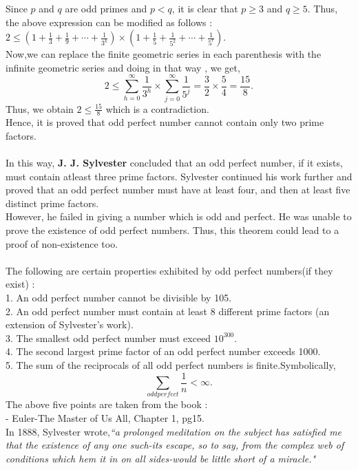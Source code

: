 \documentclass[a4paper,reqno,11pt]{book}
\theoremstyle{plain}%
\theoremstyle{definition}
\begin{document}
Since $p$ and $q$ are odd primes and $p<q$, it is clear that $p \geq 3 $ and $q \geq 5$. Thus, the above expression can be modified as follows :\\
$2 \leq (1 + \frac{1}{3} + \frac{1}{9} + \cdots + \frac{1}{3^k}) \times (1 + \frac{1}{5} + \frac{1}{5^2} + \cdots + \frac{1}{5^r}).$\\
Now,we can replace the finite geometric series in each parenthesis with the infinite geometric series and doing in that way , we get,\\
$$2 \leq \sum_{h=0}^{\infty} \frac{1}{3^h} \times \sum_{j=0}^{\infty} \frac{1}{5^j} = \frac{3}{2} \times \frac{5}{4} = \frac{15}{8}.$$
Thus, we obtain $2 \leq \frac{15}{8}$ which is a contradiction.\\
Hence, it is proved that odd perfect number cannot contain only two prime factors.\\
\\
In this way, \textbf{J. J. Sylvester} concluded that an odd perfect number, if it exists, must contain atleast three prime factors.
Sylvester continued his work further and proved that an odd perfect number must have at least four, and then at least five distinct prime factors. \\
\indent However, he failed in giving a number which is odd and perfect. He was unable to prove the existence of odd perfect numbers. Thus, this theorem could lead to a proof of non-existence too.\\
\\
The following are certain properties exhibited by odd perfect numbers(if they exist) :\\
1. An odd perfect number cannot be divisible by 105. \\
2. An odd perfect number must contain at least 8 different prime factors (an 
extension of Sylvester's work). \\
3. The smallest odd perfect number must exceed $10^{300}$.\\
4. The second largest prime factor of an odd perfect number exceeds 1000. \\
5. The sum of the reciprocals of all odd perfect numbers is finite.Symbolically,
$$ \sum_{odd perfect} \frac{1}{n} < \infty.$$
The above five points are taken from the book :\\
\vspace{2ex}
\hfill {- Euler-The Master of Us All, Chapter 1, pg15.}\\
\noindent In 1888, Sylvester wrote,\textit {``a prolonged meditation on the subject has satisfied me that the 
existence of any one such-its escape, so to say, from the complex 
web of conditions which hem it in on all sides-would be little short 
of a miracle."}\\
\end{document}
